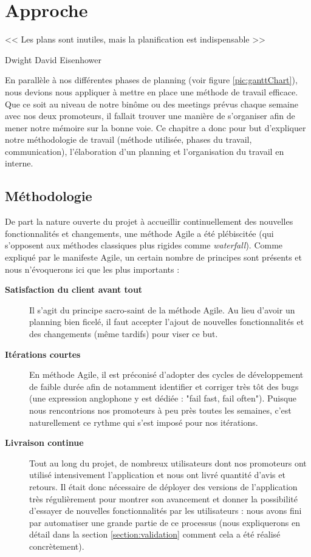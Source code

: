 \chapter{Approche}

\epigraph{<< Les plans sont inutiles, mais la planification est indispensable >>}{Dwight David Eisenhower}

En parallèle à nos différentes phases de planning (voir figure \ref{pic:ganttChart}), nous devions nous appliquer à mettre en place une méthode de travail efficace. Que ce soit au niveau de notre binôme ou des meetings prévus chaque semaine avec nos deux promoteurs, il fallait trouver une manière de s'organiser afin de mener notre mémoire sur la bonne voie. Ce chapitre a donc pour but d'expliquer notre méthodologie de travail (méthode utilisée, phases du travail, communication), l'élaboration d'un planning et l'organisation du travail en interne.

\section{Méthodologie}
\label{section:methodologie}

De part la nature ouverte du projet à accueillir continuellement des nouvelles fonctionnalités et changements, une méthode Agile a été plébiscitée (qui s'opposent aux méthodes classiques plus rigides comme \textit{waterfall}). Comme expliqué par le manifeste Agile\cite{agileManifeste}, un certain nombre de principes sont présents et nous n'évoquerons ici que les plus importants : 

\begin{description}
    \item[\textbf{Satisfaction du client avant tout}] Il s'agit du principe sacro-saint de la méthode Agile\cite{agileManifeste}. Au lieu d'avoir un planning bien ficelé, il faut accepter l'ajout de nouvelles fonctionnalités et des changements (même tardifs) pour viser ce but.
    
    \item[\textbf{Itérations courtes}] En méthode Agile\cite{agileManifeste}, il est préconisé d'adopter des cycles de développement de faible durée afin de notamment identifier et corriger très tôt des bugs (une expression anglophone y est dédiée : "fail fast, fail often"). Puisque nous rencontrions nos promoteurs à peu près toutes les semaines, c'est naturellement ce rythme qui s'est imposé pour nos itérations.
    
    \item[\textbf{Livraison continue}] Tout au long du projet, de nombreux utilisateurs dont nos promoteurs ont utilisé intensivement l'application et nous ont livré quantité d'avis et retours. Il était donc nécessaire de déployer des versions de l'application très régulièrement pour montrer son avancement et donner la possibilité d'essayer de nouvelles fonctionnalités par les utilisateurs : nous avons fini par automatiser une grande partie de ce processus (nous expliquerons en détail dans la section \ref{section:validation} comment cela a été réalisé concrètement).
\end{description}

